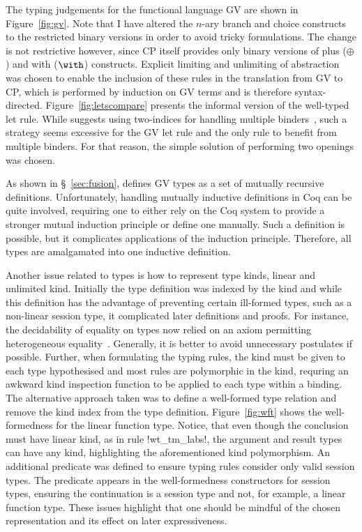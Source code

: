 


The typing judgements for the functional language GV are shown in
Figure~\ref{fig:gv}. Note that I have altered the $n$-ary branch and choice
constructs to the restricted binary versions in order to avoid tricky
formulations. The change is not restrictive however, since CP itself provides
only binary versions of plus ($\oplus$) and with ($\with$)
constructs. Explicit limiting and unlimiting of abstraction was chosen to
enable the inclusion of these rules in the translation from GV to CP, which is
performed by induction on GV terms and is therefore
syntax-directed. Figure~\ref{fig:letscompare} presents the informal version of
the well-typed let rule. While \citeauthor{Char:2012} suggests using
two-indices for handling multiple binders~\cite{Char:2012}, such a strategy
seems excessive for the GV let rule and the only rule to benefit from multiple
binders. For that reason, the simple solution of performing two openings was
chosen.

As shown in \S~\ref{sec:fusion}, \citeauthor{Wadler:2014} defines GV types as
a set of mutually recursive definitions. Unfortunately, handling mutually
inductive definitions in Coq can be quite involved, requiring one to either
rely on the Coq system to provide a stronger mutual induction principle or
define one manually. Such a definition is possible, but it complicates
applications of the induction principle. Therefore, all types are amalgamated
into one inductive definition.



Another issue related to types is how to represent type kinds, linear and
unlimited kind. Initially the type definition was indexed by the kind and
while this definition has the advantage of preventing certain ill-formed
types, such as a non-linear session type, it complicated later definitions and
proofs. For instance, the decidability of equality on types now relied on an
axiom permitting heterogeneous equality~\cite{McBride:1999}. Generally, it is
better to avoid unnecessary postulates if possible. Further, when formulating
the typing rules, the kind must be given to each type hypothesised and most
rules are polymorphic in the kind, requring an awkward kind inspection
function to be applied to each type within a binding. The alternative approach
taken was to define a well-formed type relation and remove the kind index from
the type definition. Figure~\ref{fig:wft} shows the well-formedness for the
linear function type. Notice, that even though the conclusion must have linear
kind, as in rule \coqe!wt_tm_labs!, the argument and result types can have any
kind, highlighting the aforementioned kind polymorphism. An additional
predicate was defined to ensure typing rules consider only valid session
types. The predicate appears in the well-formedness constructors for session
types, ensuring the continuation is a session type and not, for example, a
linear function type. These issues highlight that one should be mindful of the
chosen representation and its effect on later expressiveness.

